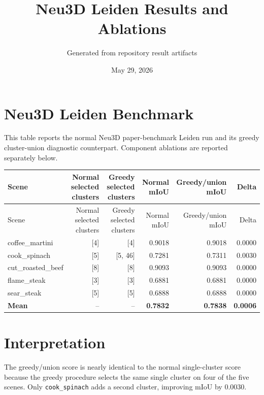 \documentclass[10pt]{article}
\begin{document}
\title{Neu3D Leiden Results and Ablations}
\author{Generated from repository result artifacts}
\date{May 29, 2026}
\maketitle

\section{Neu3D Leiden Benchmark}
This table reports the normal Neu3D paper-benchmark Leiden run and its greedy cluster-union diagnostic counterpart.  Component ablations are reported separately below.

\small
\begin{longtable}{lrrrrr}
\toprule
Scene & Normal selected clusters & Greedy selected clusters & Normal mIoU & Greedy/union mIoU & Delta \\
\midrule
\endfirsthead
\toprule
Scene & Normal selected clusters & Greedy selected clusters & Normal mIoU & Greedy/union mIoU & Delta \\
\midrule
\endhead
coffee\_martini & [4] & [4] & 0.9018 & 0.9018 & 0.0000 \\
cook\_spinach & [5] & [5, 46] & 0.7281 & 0.7311 & 0.0030 \\
cut\_roasted\_beef & [8] & [8] & 0.9093 & 0.9093 & 0.0000 \\
flame\_steak & [3] & [3] & 0.6881 & 0.6881 & 0.0000 \\
sear\_steak & [5] & [5] & 0.6888 & 0.6888 & 0.0000 \\
\midrule
\textbf{Mean} & -- & -- & \textbf{0.7832} & \textbf{0.7838} & \textbf{0.0006} \\
\bottomrule
\end{longtable}
\normalsize

\section{Interpretation}
The greedy/union score is nearly identical to the normal single-cluster score because the greedy procedure selects the same single cluster on four of the five scenes.  Only \texttt{cook\_spinach} adds a second cluster, improving mIoU by 0.0030.
\end{document}
